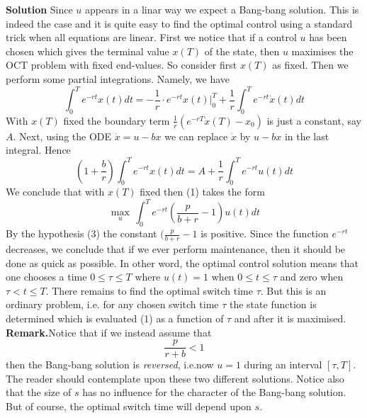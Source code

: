 \documentclass{amsart}
\begin{document}
\noindent
{\bf Solution} Since $u$ appears in a linar way
we expect a Bang-bang solution. This is indeed the case and
it is quite easy to find the optimal control using a standard trick 
when all equations are
linear.
First we notice that if a control $u$ has been
chosen which gives the terminal value $x(T)$ of the state, then
$u$ maximises the OCT problem with fixed end-values. 
So consider first $x(T)$ as fixed. Then we perform some partial integrations.
Namely, we have
\begin{equation*}
\int_0^T e^{-rt}x(t)dt=-\frac{1}{r}\cdot
e^{-rt}x(t)|_0^T+\frac{1}{r}\int_0^T e^{-rt}\dot x(t)dt
\end{equation*}
\medskip With $x(T)$ fixed the boundary term
$\frac{1}{r}( e^{-rT}\dot x(T)-x_0)$ is just a constant, say $A$. 
Next, using the ODE $\dot x=u-bx$ we can replace $\dot x$ by $u-bx$ in the last integral. Hence
\begin{equation*}
(1+\frac{b}{r})\int_0^T e^{-rt}x(t)dt=A+
\frac{1}{r}\int_0^T e^{-rt}u(t)dt
\end{equation*}
\medskip
We conclude that with $x(T)$ fixed then (1) takes the form
\begin{equation*}
\max_u\,\int_0^T e^{-rt}(\frac{p}{b+r}-1)u(t)dt
\end{equation*}
\medskip By the hypothesis (3) the constant
$(\frac{p}{b+r}-1$ is positive.
Since the function $e^{-rt}$ decreases, we conclude that
if we ever perform maintenance, then it should be
done as quick as possible.
In other word, the optimal control solution means that one chooses
a time $0\leq\tau\leq T$ where $u(t)=1$ when $0\leq t\leq\tau$ and zero when 
$\tau<t\leq T$.
There remains to find the optimal switch time $\tau$.
But this is an ordinary problem, i.e. for any chosen switch time
$\tau$ the state function is determined which is evaluated (1) as a function of 
$\tau$ and  after it is maximised.
\medskip
\newline \noindent
{\bf Remark.}Notice that if we instead assume that
\begin{equation*}
\frac{p}{r+b}<1
\end{equation*}
then the Bang-bang solution is \emph{reversed}, i.e.now
$u=1$ during an interval $[\tau,T]$.
The reader should contemplate upon these two different solutions. 
Notice also that the size of $s$ has no influence for the character of the Bang-bang solution. But of course, the 
optimal switch time
will depend upon $s$.
\end{document}
